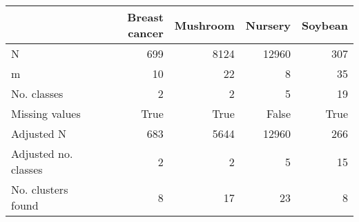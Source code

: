 \begin{tabular}{lrrrr}
\toprule
{} & Breast cancer & Mushroom & Nursery & Soybean \\
\midrule
N                    &           699 &     8124 &   12960 &     307 \\
m                    &            10 &       22 &       8 &      35 \\
No. classes          &             2 &        2 &       5 &      19 \\
Missing values       &          True &     True &   False &    True \\
Adjusted N           &           683 &     5644 &   12960 &     266 \\
Adjusted no. classes &             2 &        2 &       5 &      15 \\
No. clusters found   &             8 &       17 &      23 &       8 \\
\bottomrule
\end{tabular}

